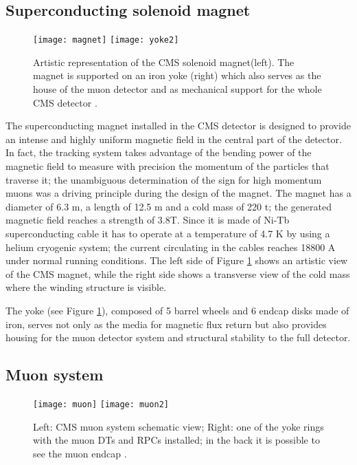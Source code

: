 \subsection{Superconducting solenoid magnet}

\begin{figure}[h!]
  \centering
  \texttt{[image: magnet]}
  \texttt{[image: yoke2]}
  \caption[CMS solenoid magnet]{Artistic representation of the CMS solenoid magnet(left). The magnet is supported on an iron yoke (right) which also serves as the house of the muon detector and as mechanical support for the whole CMS detector \cite{yoke2}.}
  \label{fig:yoke}
\end{figure}

The superconducting magnet installed in the CMS detector is designed to provide an intense and highly uniform magnetic field in the central part of the detector. In fact, the tracking system takes advantage of the bending power of the magnetic field to measure with precision the momentum of the particles that traverse it; the unambiguous determination of the sign for high momentum muons was a driving principle during the design of the magnet. The magnet has a diameter of 6.3 m, a length of 12.5 m and a cold mass of 220 t; the generated magnetic field reaches a strength of 3.8T. Since it is made of Ni-Tb superconducting cable it has to operate at a temperature of 4.7 K by using a helium cryogenic system; the current circulating in the cables reaches 18800 A under normal running conditions. The left side of Figure \ref{fig:yoke} shows an artistic view of the CMS magnet, while the right side shows a transverse view of the cold mass where the winding structure is visible.

The yoke (see Figure \ref{fig:yoke}), composed of 5 barrel wheels and 6 endcap disks made of iron, serves not only as the media for magnetic flux return but also provides housing for the muon detector system and structural stability to the full detector.     

\subsection{Muon system }

\begin{figure}[h!]
  \centering
  \texttt{[image: muon]}
  \texttt{[image: muon2]}
  \caption[CMS Muon system schematic view]{Left: CMS muon system schematic view; Right: one of the yoke rings with the muon DTs and RPCs installed; in the back it is possible to see the muon endcap \cite{muon}. }
  \label{fig:muon_chambers}
\end{figure}

